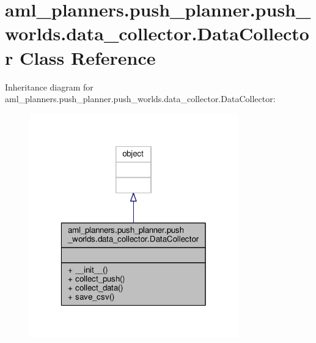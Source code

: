\hypertarget{classaml__planners_1_1push__planner_1_1push__worlds_1_1data__collector_1_1_data_collector}{\section{aml\-\_\-planners.\-push\-\_\-planner.\-push\-\_\-worlds.\-data\-\_\-collector.\-Data\-Collector Class Reference}
\label{classaml__planners_1_1push__planner_1_1push__worlds_1_1data__collector_1_1_data_collector}
}


Inheritance diagram for aml\-\_\-planners.\-push\-\_\-planner.\-push\-\_\-worlds.\-data\-\_\-collector.\-Data\-Collector\-:
\nopagebreak
\begin{figure}[H]
\begin{center}
\leavevmode
\includegraphics[width=256pt]{classaml__planners_1_1push__planner_1_1push__worlds_1_1data__collector_1_1_data_collector__inherit__graph}
\end{center}
\end{figure}


